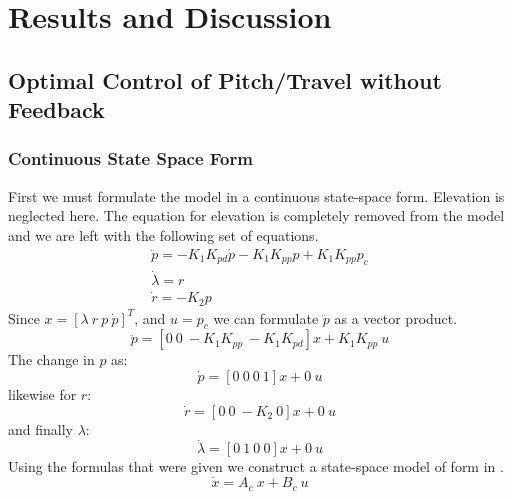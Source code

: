 \newcommand{\texMacro}[2]{\texttt{\textbackslash{#1}\{#2\}}}
\section{Results and Discussion}
\subsection{Optimal Control of Pitch/Travel without Feedback}

\subsubsection{Continuous State Space Form}
First we must formulate the model  in a continuous state-space form. Elevation is neglected here.
The equation for elevation  is completely removed from the model  and we are left with the following set of equations.
\begin{subequations}
	\begin{align}
		\ddot{p} = - K_1K_{pd}\dot{p} - K_1K_{pp}p + K_1K_{pp}p_c \\
		\dot{\lambda} = r \\
		\dot{r} = -K_2p
	\end{align}
\end{subequations}
Since $ x = [\lambda\ r\ p\ \dot{p}]^T $, and $ u = p_c $ we can formulate $\ddot{p}$ as a vector product.
\begin{equation}
	\ddot{p} = [0\ 0\ -K_1K_{pp}\ -K_1K_{pd}] x + K_1K_{pp}\ u
\end{equation}
The change in $ p $ as:
\begin{equation}
\dot{p} = [0\ 0\ 0\ 1] x + 0\ u
\end{equation}
likewise for $ r $:
\begin{equation}
	\dot{r} = [0\ 0\ -K_2\ 0] x + 0\ u
\end{equation}
and finally $\lambda$:
\begin{equation}
	\dot{\lambda} = [0\ 1\ 0\ 0] x + 0\ u
\end{equation}
Using the formulas that were given we construct a state-space model of form in .
\begin{equation}\label{eq:state-space}
	\dot{x} = A_c\ x + B_c\ u
\end{equation}


